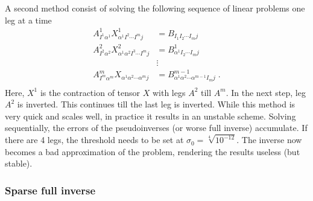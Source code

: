 A second method consist of solving the following sequence of linear problems one leg at a time
\begin{equation}
    \begin{split}
        A^1_{ I^1 \alpha^1 } X^1_{ \alpha^1  I^2 \cdots I^m j} &=  B_{  I_1  I_2 \cdots I_m   j }\\
        A^2_{ I^2 \alpha^2 } X^2_{ \alpha^1   \alpha^2  I^3 \cdots I^m j} &=  B^1_{  \alpha^1  I_2 \cdots I_m   j }\\
        &\vdots\\
        A^m_{ I^m \alpha^m } X_{ \alpha^1 \alpha^2 \cdots \alpha^m j  } &=  B^{m-1}_{ \alpha^1 \alpha^2 \cdots \alpha^{m-1} I_m   j } \;.\\
    \end{split}
\end{equation}
Here, $X^1$ is the contraction of tensor $X$ with legs $A^2$ till $A^m$. In the next step, leg $A^2$ is inverted. This continues till the last leg is inverted.
While this method is very quick and scales well, in practice it results in an unstable scheme. Solving sequentially, the errors of the pseudoinverses (or worse full inverse) accumulate. If there are 4 legs, the threshold needs to be set at $ \sigma_0 = \sqrt[4]{ 10^{-12} } $. The inverse now becomes a bad approximation of the problem, rendering the results useless (but stable).

\subsubsection{Sparse full inverse}

